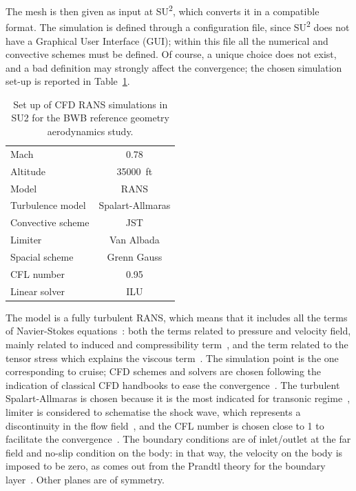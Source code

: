 The mesh is then given as input at SU\textsuperscript{2}, which converts it in a compatible format. 
The simulation is defined through a configuration file, since SU\textsuperscript{2} does not have a Graphical User Interface (GUI); within this file all the numerical and convective schemes must be defined. 
Of course, a unique choice does not exist, and a bad definition may strongly affect the convergence; the chosen simulation set-up is reported in Table~\ref{tab:bwb_cfd_setup}.
\begin{table}[!h]
	\centering
	\begin{tabular}{l c}
		\hline
		Mach & 0.78 \\
		Altitude & 35000~ft \\
		Model & RANS \\
		Turbulence model & Spalart-Allmaras \\
		Convective scheme & JST \\
		Limiter & Van Albada \\
		Spacial scheme & Grenn Gauss \\
		CFL number & 0.95 \\
		Linear solver & ILU \\
		\hline
	\end{tabular}
	\caption{Set up of CFD RANS simulations in SU2 for the BWB reference geometry aerodynamics study.}
	\label{tab:bwb_cfd_setup}
\end{table} 
The model is a fully turbulent RANS, which means that it includes all the terms of Navier-Stokes equations~\cite{bib:landau}: both the terms related to pressure and velocity field, mainly related to induced and compressibility term~\cite{bib:monti_pt1}, and the term related to the tensor stress which explains the viscous term~\cite{bib:monti_pt2}. 
The simulation point is the one corresponding to cruise; CFD schemes and solvers are chosen following the indication of classical CFD handbooks to ease the convergence~\cite{bib:ferziger_peric, bib:anderson_aero}. 
The turbulent Spalart-Allmaras is chosen because it is the most indicated for transonic regime~\cite{bib:pope}, limiter is considered to schematise the shock wave, which represents a discontinuity in the flow field~\cite{bib:leveque_conservation_laws}, and the CFL number is chosen close to 1 to facilitate the convergence~\cite{bib:leveque_partial_equation}.
The boundary conditions are of inlet/outlet at the far field and no-slip condition on the body: in that way, the velocity on the body is imposed to be zero, as comes out from the Prandtl theory for the boundary layer~\cite{bib:monti_pt2}. 
Other planes are of symmetry. 

